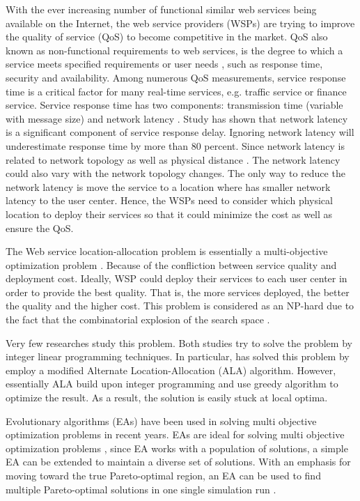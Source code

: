 \documentclass[twoside]{article}
\begin{document}
With the ever increasing number of functional similar web services being available on the Internet, the web service providers (WSPs) are trying to improve the quality of service (QoS) to become competitive in the market.  
QoS also known as non-functional requirements to  web services, is the degree to which a service meets specified requirements or user needs \cite{4061431}, such as response time, security and availability. 
Among numerous QoS measurements, service response time is a critical factor for many real-time services, e.g. traffic service or finance service. 
Service response time has two components: transmission time (variable with message size) and network latency \cite{Johansson:2000:INL:595252.595281}. 
Study \cite{916684} has shown that network latency is a significant component of service response delay.
Ignoring network latency will underestimate response time by more than 80 percent. Since network latency is related to network topology as well as physical distance \cite{distanceMetrics}. 
The network latency could also vary with the network topology changes.
The only way to reduce the network latency is move the service to a location where has smaller network latency to the user center. 
Hence, the WSPs need to consider which physical location to deploy their services so that it could minimize the cost as well as ensure the QoS.

The Web service location-allocation problem is essentially a multi-objective optimization problem \cite{Multiobjective}.
Because of the confliction between service quality and deployment cost. 
Ideally, WSP could deploy their services to each user center in order to provide the best quality.
That is, the more services deployed, the better the quality and the higher cost. 
This problem is considered as an NP-hard due to the fact that the combinatorial explosion of the search space \cite{Vanrompay:2008:GAO:1387309.1387313}. 


Very few researches \cite{Aboolian200964, Sun} study this problem.
Both studies try to solve the problem by integer linear programming techniques.
In particular, \cite{Sun} has solved this problem by employ a modified Alternate Location-Allocation (ALA) algorithm. 
However, essentially ALA build upon integer programming and use greedy algorithm to optimize the result. 
As a result, the solution is easily stuck at local optima.

Evolutionary algorithms (EAs) have been used in solving multi objective optimization problems in recent years. 
EAs are ideal for solving multi objective optimization problems \cite{key:article}, since EA works with a population of solutions, 
a simple EA can be extended to maintain a diverse set of solutions.
With an emphasis for moving toward the true Pareto-optimal region, an EA can be used to find multiple Pareto-optimal solutions in one single simulation run \cite{OptimizationElectrical}.
\end{document}
